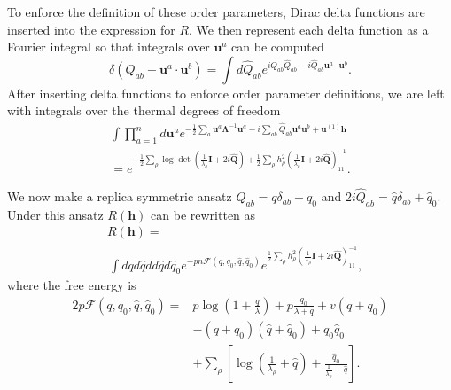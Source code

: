 \documentclass{article}
\begin{document}
To enforce the definition of these order parameters, Dirac delta functions are inserted into the expression for $R$. We then represent each delta function as a Fourier integral so that integrals over $\mathbf{u}^a$ can be computed 
\begin{equation}
    \delta( Q_{ab} - \mathbf{u}^a \cdot \mathbf{u}^b) = \int d\hat{Q}_{ab} e^{i Q_{ab} \hat{Q}_{ab} - i \hat{Q}_{ab} \mathbf{u}^a \cdot \mathbf{u}^b}.
\end{equation}
%
After inserting delta functions to enforce order parameter definitions, we are left with integrals over the thermal degrees of freedom
\begin{align}
    \int \prod_{a=1}^n d\mathbf{u}^a e^{ -\frac{1}{2} \sum_{a} \mathbf{u}^a\mathbf{\Lambda}^{-1} \mathbf{u}^a - i\sum_{ab}\hat{Q}_{ab} \mathbf{u}^a \mathbf{u}^b + \mathbf{u}^{(1)} \mathbf{h} } \nonumber
    \\
    = e^{- \frac{1}{2} \sum_\rho \log \det(\frac{1}{\lambda_\rho} \mathbf{I} + 2i\mathbf{\hat{Q}}) + \frac{1}{2} \sum_\rho h_\rho^2 (\frac{1}{\lambda_\rho} \mathbf{I} + 2i\mathbf{\hat{Q}})^{-1}_{11}}.
\end{align}

We now make a replica symmetric ansatz $Q_{ab} = q \delta_{ab} + q_0$ and $2 i \hat{Q}_{ab} = \hat{q} \delta_{ab} + \hat{q}_0$. Under this ansatz $R(\mathbf{h})$ can be rewritten as 
\begin{align}
    &R(\mathbf{h}) = \nonumber \\
    &\,\int d q d\hat{q} d d\hat{q} d\hat{q}_0 e^{- p n \mathcal{F}(q,q_0,\hat{q}, \hat{q}_0)} e^{\frac{1}{2} \sum_\rho h_\rho^2  (\frac{1}{\lambda_\rho}\mathbf{I} + 2i\mathbf{\hat{Q}})_{11}^{-1}},
\end{align}
%
where the free energy is
\begin{align}
    2 p \mathcal{F}(q,q_0,\hat{q}, \hat{q}_0) = & p \log\left(1 + \frac{q}{\lambda} \right) + p\frac{q_0}{\lambda + q} + v (q+ q_0) \nonumber
    \\
    &- (q +q_0)(\hat{q} + \hat{q}_0) + q_0 \hat{q}_0 \nonumber
    \\
    &+ \sum_{\rho}\left[ \log\left(\frac{1}{\lambda_\rho} + \hat{q}\right) + \frac{\hat{q}_0}{\frac{1}{\lambda_\rho} + \hat{q}} \right].
\end{align}
\end{document}
